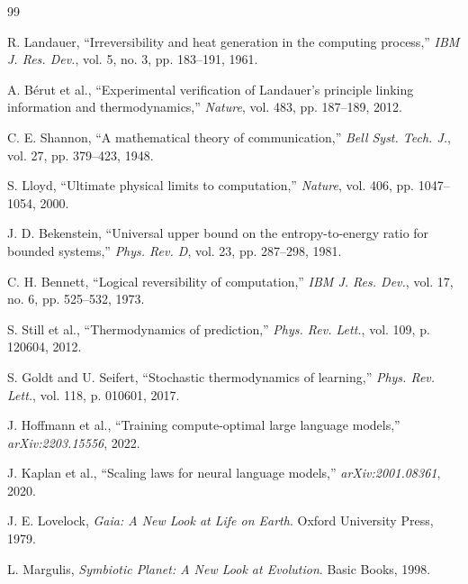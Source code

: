 \documentclass{article}
\begin{document}
\begin{thebibliography}{99}

R. Landauer, ``Irreversibility and heat generation in the computing process,'' \textit{IBM J. Res. Dev.}, vol. 5, no. 3, pp. 183--191, 1961.

A. Bérut et al., ``Experimental verification of Landauer's principle linking information and thermodynamics,'' \textit{Nature}, vol. 483, pp. 187--189, 2012.

C. E. Shannon, ``A mathematical theory of communication,'' \textit{Bell Syst. Tech. J.}, vol. 27, pp. 379--423, 1948.

S. Lloyd, ``Ultimate physical limits to computation,'' \textit{Nature}, vol. 406, pp. 1047--1054, 2000.

J. D. Bekenstein, ``Universal upper bound on the entropy-to-energy ratio for bounded systems,'' \textit{Phys. Rev. D}, vol. 23, pp. 287--298, 1981.

C. H. Bennett, ``Logical reversibility of computation,'' \textit{IBM J. Res. Dev.}, vol. 17, no. 6, pp. 525--532, 1973.

S. Still et al., ``Thermodynamics of prediction,'' \textit{Phys. Rev. Lett.}, vol. 109, p. 120604, 2012.

S. Goldt and U. Seifert, ``Stochastic thermodynamics of learning,'' \textit{Phys. Rev. Lett.}, vol. 118, p. 010601, 2017.

J. Hoffmann et al., ``Training compute-optimal large language models,'' \textit{arXiv:2203.15556}, 2022.

J. Kaplan et al., ``Scaling laws for neural language models,'' \textit{arXiv:2001.08361}, 2020.

J. E. Lovelock, \textit{Gaia: A New Look at Life on Earth}. Oxford University Press, 1979.

L. Margulis, \textit{Symbiotic Planet: A New Look at Evolution}. Basic Books, 1998.

\end{thebibliography}
\end{document}
